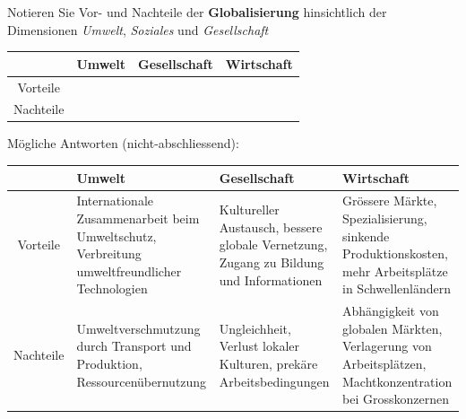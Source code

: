 \begin{myexercise}
Notieren Sie Vor- und Nachteile der \textbf{Globalisierung} hinsichtlich der Dimensionen \textit{Umwelt}, \textit{Soziales} und \textit{Gesellschaft}
\begin{table}[H]
\centering
\begin{tabular}{c|p{}|p{}|p{}}
& Umwelt & Gesellschaft & Wirtschaft \\\midrule\midrule
Vorteile & & & \\[50pt]\midrule
Nachteile & & & \\[50pt]
\end{tabular}
\end{table}
\begin{myanswer}
Mögliche Antworten (nicht-abschliessend):
\begin{table}[H]
\centering
\small
\begin{tabular}{c|p{}|p{}|p{}}
& Umwelt & Gesellschaft & Wirtschaft \\\midrule\midrule
Vorteile 
& Internationale Zusammenarbeit beim Umweltschutz, Verbreitung umweltfreundlicher Technologien 
& Kultureller Austausch, bessere globale Vernetzung, Zugang zu Bildung und Informationen 
& Grössere Märkte, Spezialisierung, sinkende Produktionskosten, mehr Arbeitsplätze in Schwellenländern \\[50pt]\midrule
Nachteile 
& Umweltverschmutzung durch Transport und Produktion, Ressourcenübernutzung 
& Ungleichheit, Verlust lokaler Kulturen, prekäre Arbeitsbedingungen 
& Abhängigkeit von globalen Märkten, Verlagerung von Arbeitsplätzen, Machtkonzentration bei Grosskonzernen \\[50pt]
\end{tabular}
\end{table}
\end{myanswer}
\end{myexercise}

